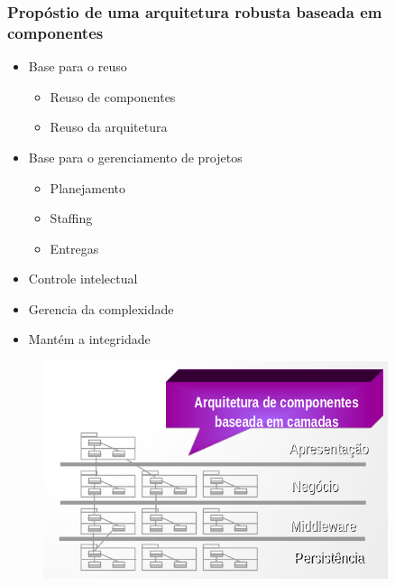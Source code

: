 \begin{frame}
 \frametitle{Propóstio de uma arquitetura robusta baseada em componentes}
  \begin{minipage}[t]{0.48\linewidth}
  \begin{itemize}
   \item Base para o reuso
   \begin{itemize}
    \item Reuso de componentes
    \item Reuso da arquitetura
   \end{itemize}
  \item Base para o gerenciamento de projetos
  \begin{itemize}
   \item Planejamento
   \item Staffing
   \item Entregas
  \end{itemize}
  \item Controle intelectual
  

  \end{itemize}
 \end{minipage}
\begin{minipage}[t]{0.48\linewidth}
\begin{itemize}
   \item Gerencia da complexidade
    \item Mantém a integridade
  \end{itemize}
  \begin{figure}
   \centering
   \includegraphics[width = 0.9\textwidth]{figs/fig11.png}
  \end{figure}
\end{minipage}

\end{frame}

